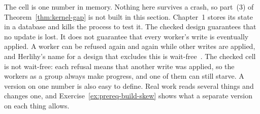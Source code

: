 \begin{pdboundary}
\setlength{\parskip}{4pt plus 1pt}
The cell is one number in memory. Nothing here survives a crash, so
part~(3) of Theorem~\ref{thm:kernel-gap} is not built in this section.
Chapter~1 stores its state in a database and kills the process to test it.
The checked design guarantees that no update is lost. It does not guarantee
that every worker's write is eventually applied. A worker can be refused
again and again while other writes are applied, and Herlihy's name for a
design that excludes this is
wait-free~. The checked cell is not wait-free:
each refusal means that another write was applied, so the workers as a
group always make progress, and one of them can still starve. A version on
one number is also easy to define. Real work reads several things and
changes one, and Exercise~\ref{ex:prereq-build-skew} shows what a separate
version on each thing allows.
\end{pdboundary}
